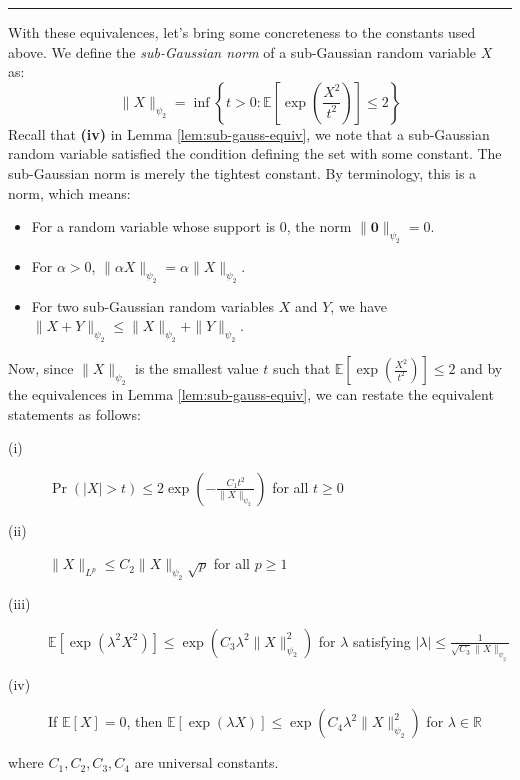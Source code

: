 \documentclass{article}
\theoremstyle{remark}
\newcommand{\comprule}{\textcolor[RGB]{220,220,220}{\rule{\linewidth}{0.2pt}}}
\newcommand{\real}{\mathbb{R}}
\newcommand{\Exp}{\mathbb{E}}
\begin{document}
\comprule

With these equivalences, let's bring some concreteness to the constants used above. We define the \emph{sub-Gaussian norm} of a sub-Gaussian random variable \(X\) as:
\begin{equation*}
\|X\|_{\psi_{2}} = \inf\left\{t > 0 : \Exp\left[\exp\left(\frac{X^{2}}{t^{2}}\right)\right] \leq 2\right\}
\end{equation*}
Recall that \textbf{(iv)} in Lemma \ref{lem:sub-gauss-equiv}, we note that a sub-Gaussian random variable satisfied the condition defining the set with some constant. The sub-Gaussian norm is merely the tightest constant. By terminology, this is a norm, which means:
\begin{itemize}
\item For a random variable whose support is \(0\), the norm \(\|\mathbf{0}\|_{\psi_{2}} = 0\).
\item For \(\alpha > 0\), \(\|\alpha X\|_{\psi_{2}} = \alpha \|X\|_{\psi_{2}}\).
\item For two sub-Gaussian random variables \(X\) and \(Y\), we have \(\|X + Y\|_{\psi_{2}} \leq \|X\|_{\psi_{2}} + \|Y\|_{\psi_{2}}\).
\end{itemize}

Now, since \(\|X\|_{\psi_{2}}\) is the smallest value \(t\) such that \(\Exp\left[\exp\left(\frac{X^{2}}{t^{2}}\right)\right] \leq 2\) and by the equivalences in Lemma \ref{lem:sub-gauss-equiv}, we can restate the equivalent statements as follows:
\begin{description}
\item [(i)] \(\Pr(|X| > t) \leq 2\exp\left(-\frac{C_{1}t^{2}}{\|X\|_{\psi_{2}}}\right)\) for all \(t \geq 0\)
\item [(ii)] \(\|X\|_{L^{p}} \leq C_{2}\|X\|_{\psi_{2}}\sqrt{p}\) for all \(p \geq 1\)
\item [(iii)] \(\Exp\left[\exp(\lambda^{2}X^{2})\right] \leq \exp(C_{3}\lambda^{2}\|X\|_{\psi_{2}}^{2})\) for \(\lambda\) satisfying \(|\lambda| \leq \frac{1}{\sqrt{C_{3}} \|X\|_{\psi_{2}}}\)
\item [(iv)] If \(\Exp[X] = 0\), then \(\Exp[\exp(\lambda X)] \leq \exp(C_{4}\lambda^{2}\|X\|_{\psi_{2}}^{2})\) for \(\lambda \in \real\)
\end{description}
where \(C_{1}, C_{2}, C_{3}, C_{4}\) are universal constants.
\end{document}
